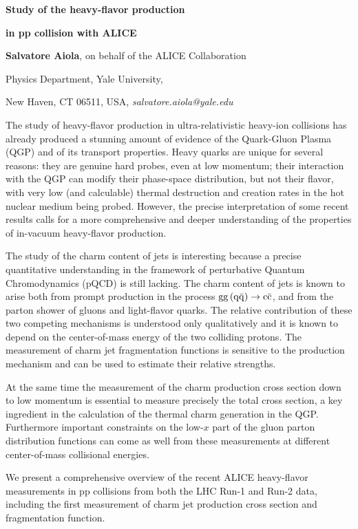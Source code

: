 \documentclass[12pt]{article}
\begin{document}
\centerline{\bf 
Study of the heavy-flavor production 
}

\centerline{\bf 
in pp collision with ALICE
}

\vspace{12pt}

\centerline{ {\bf Salvatore Aiola}, on behalf of the ALICE Collaboration }

\vspace{12pt}

\centerline{Physics Department, Yale University,
}\centerline{New Haven, CT 06511, USA, {\it salvatore.aiola@yale.edu}}

\vspace{12pt}


\vspace{12pt} \vspace{12pt}
The study of heavy-flavor production in ultra-relativistic heavy-ion collisions has already produced
a stunning amount of evidence of the Quark-Gluon Plasma (QGP) and of its transport properties. 
Heavy quarks are unique for several reasons: they are genuine hard probes, even at low momentum;
their interaction with the QGP can modify their phase-space distribution, but not their flavor, with very low
(and calculable) thermal destruction and creation rates in the hot nuclear medium being probed.
However, the precise interpretation of some recent results calls for a more comprehensive and deeper understanding
of the properties of in-vacuum heavy-flavor production.

The study of the charm content of jets is interesting because 
a precise quantitative understanding in the framework of perturbative
Quantum Chromodynamics (pQCD) is still lacking.
The charm content of jets is known to arise both from prompt production in the process ${\rm gg\, (q\bar{q})} \rightarrow {\rm c\bar{c}}$, and
from the parton shower of gluons and light-flavor quarks.
The relative contribution of these two competing mechanisms is understood only qualitatively
and it is known to depend on the center-of-mass energy of the two colliding protons.
The measurement of charm jet fragmentation functions is sensitive to the production mechanism and 
can be used to estimate their relative strengths.

At the same time the measurement of the charm production cross section down
to low momentum is essential to measure precisely the total cross section, a key ingredient in the calculation
of the thermal charm generation in the QGP. Furthermore important constraints on the low-$x$ part of the gluon parton distribution functions can come
as well from these measurements at different center-of-mass collisional energies.

We present a comprehensive overview of the recent \mbox{ALICE} heavy-flavor measurements in pp collisions from both the LHC Run-1 and Run-2 data,
including the first measurement of charm jet production cross section and fragmentation function.
\end{document}
